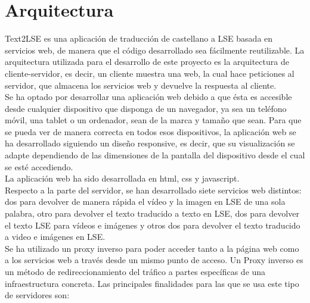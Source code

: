 \section{Arquitectura}
\label{cap4:sec:Arquitectura}

Text2LSE es una aplicación de traducción de castellano a LSE basada en servicios web, de manera que el código desarrollado sea fácilmente reutilizable. La arquitectura utilizada para el desarrollo de este proyecto es la arquitectura de cliente-servidor, es decir, un cliente muestra una web, la cual hace peticiones al servidor, que almacena los servicios web y devuelve la respuesta al cliente.\\

Se ha optado por desarrollar una aplicación web debido a que ésta es accesible desde cualquier dispositivo que disponga de un navegador, ya sea un teléfono móvil, una tablet o un ordenador, sean de la marca y tamaño que sean. Para que se pueda ver de manera correcta en todos esos dispositivos, la aplicación web se ha desarrollado siguiendo un diseño responsive, es decir, que su visualización se adapte dependiendo de las dimensiones de la pantalla del dispositivo desde el cual se esté accediendo.\\

La aplicación web ha sido desarrollada en html, css y javascript.\\

Respecto a la parte del servidor, se han desarrollado siete servicios web distintos: dos para devolver de manera rápida el vídeo y la imagen en LSE de una sola palabra, otro para devolver el texto traducido a texto en LSE, dos para devolver el texto LSE para vídeos e imágenes y otros dos para devolver el texto traducido a video e imágenes en LSE. \\

Se ha utilizado un proxy inverso para poder acceder tanto a la página web como a los servicios web a través desde un mismo punto de acceso. Un Proxy inverso es un método de redireccionamiento del tráfico a partes específicas de una infraestructura concreta\citep*{proxyInverso}. Las principales finalidades para las que se usa este tipo de servidores son:

